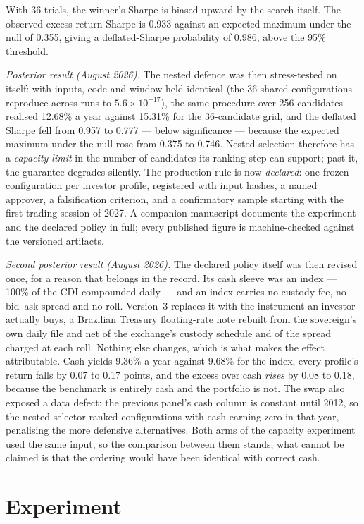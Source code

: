 \documentclass[10pt,conference]{IEEEtran}
\begin{document}
With 36 trials, the winner's Sharpe is biased upward by the search itself. The observed excess-return Sharpe is 0.933 against an expected maximum under the null of 0.355, giving a deflated-Sharpe probability of 0.986, above the 95\% threshold.

\emph{Posterior result (August 2026).} The nested defence was then stress-tested on itself: with inputs, code and window held identical (the 36 shared configurations reproduce across runs to $5.6\times10^{-17}$), the same procedure over 256 candidates realised 12.68\% a year against 15.31\% for the 36-candidate grid, and the deflated Sharpe fell from 0.957 to 0.777 --- below significance --- because the expected maximum under the null rose from 0.375 to 0.746. Nested selection therefore has a \emph{capacity limit} in the number of candidates its ranking step can support; past it, the guarantee degrades silently. The production rule is now \emph{declared}: one frozen configuration per investor profile, registered with input hashes, a named approver, a falsification criterion, and a confirmatory sample starting with the first trading session of 2027. A companion manuscript documents the experiment and the declared policy in full; every published figure is machine-checked against the versioned artifacts.

\emph{Second posterior result (August 2026).} The declared policy itself was then revised once, for a reason that belongs in the record. Its cash sleeve was an index --- 100\% of the CDI compounded daily --- and an index carries no custody fee, no bid--ask spread and no roll. Version~3 replaces it with the instrument an investor actually buys, a Brazilian Treasury floating-rate note rebuilt from the sovereign's own daily file and net of the exchange's custody schedule and of the spread charged at each roll. Nothing else changes, which is what makes the effect attributable. Cash yields 9.36\% a year against 9.68\% for the index, every profile's return falls by 0.07 to 0.17 points, and the excess over cash \emph{rises} by 0.08 to 0.18, because the benchmark is entirely cash and the portfolio is not. The swap also exposed a data defect: the previous panel's cash column is constant until 2012, so the nested selector ranked configurations with cash earning zero in that year, penalising the more defensive alternatives. Both arms of the capacity experiment used the same input, so the comparison between them stands; what cannot be claimed is that the ordering would have been identical with correct cash.

\section{Experiment}
\end{document}
